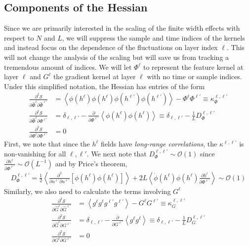 \documentclass{article} %
\begin{document}
\subsection{Components of the Hessian}
Since we are primarily interested in the scaling of the finite width effects with respect to $N$ and $L$, we will suppress the sample and time indices of the kernels and instead focus on the dependence of the fluctuations on layer index $\ell$. This will not change the analysis of the scaling but will save us from tracking a tremendous amount of indices. We will let $\Phi^\ell$ to represent the feature kernel at layer $\ell$ and $G^\ell$ the gradient kernel at layer $\ell$ with no time or sample indices. Under this simplified notation, the Hessian has entries of the form 
\begin{align}
   \frac{\partial^2 \mathcal S}{\partial \hat\Phi^\ell \partial \hat\Phi^{\ell'}} &= \left<  \phi(h^\ell) \phi(h^\ell) \phi(h^{\ell'}) \phi(h^{\ell'}) \right> - \Phi^\ell \Phi^{\ell'} \equiv \kappa^{\ell,\ell'}_{\Phi} \nonumber
   \\
   \frac{\partial^2 \mathcal S}{\partial \hat\Phi^\ell \partial \Phi^{\ell'}} &= \delta_{\ell,\ell'} - \frac{\partial}{\partial \Phi^{\ell'}} \left< \phi(h^\ell) \phi(h^\ell) \right> \equiv \delta_{\ell,\ell'} - \frac{1}{L} D^{\ell,\ell'}_{\Phi}  \nonumber
   \\
   \frac{\partial^2 \mathcal S}{\partial \Phi^\ell \partial \Phi^{\ell'}} &= 0  
\end{align}
First, we note that since the $h^\ell$ fields have \textit{long-range correlations}, the $\kappa^{\ell,\ell'}$ is non-vanishing for all $\ell, \ell'$. We next note that $D_\Phi^{\ell,\ell'} \sim \mathcal{O}(1)$ since $\frac{\partial h^\ell}{\partial \Phi^{\ell'}} \sim \mathcal{O}(L^{-1})$ and by Price's theorem,
\begin{align}
    D^{\ell,\ell'}_\Phi = \frac{1}{2} \left< \frac{\partial^2}{\partial u^{\ell'}  \partial u^{\ell'}} [\phi(h^\ell)  \phi(h^\ell) ] \right> + 2 L \left< \dot\phi(h^\ell) \phi(h^\ell) \frac{\partial h^\ell}{\partial \Phi^{\ell'}} \right> \sim \mathcal{O}(1)
\end{align}
Similarly, we also need to calculate the terms involving $G^{\ell}$
\begin{align}
    \frac{\partial^2 \mathcal S}{\partial \hat G^\ell \partial \hat G^{\ell'}} &= \left<  g^\ell g^\ell g^{\ell'} g^{\ell'} \right> - G^\ell G^{\ell'} \equiv \kappa^{\ell,\ell'}_{G} \nonumber
   \\
   \frac{\partial^2 \mathcal S}{\partial \hat G^\ell \partial G^{\ell'}} &= \delta_{\ell,\ell'} - \frac{\partial}{\partial G^{\ell'}} \left< g^\ell g^\ell \right> \equiv \delta_{\ell,\ell'} - \frac{1}{L} D^{\ell,\ell'}_{G}  \nonumber
   \\
   \frac{\partial^2 \mathcal S}{\partial G^\ell \partial G^{\ell'}} &= 0 
\end{align}
\end{document}

